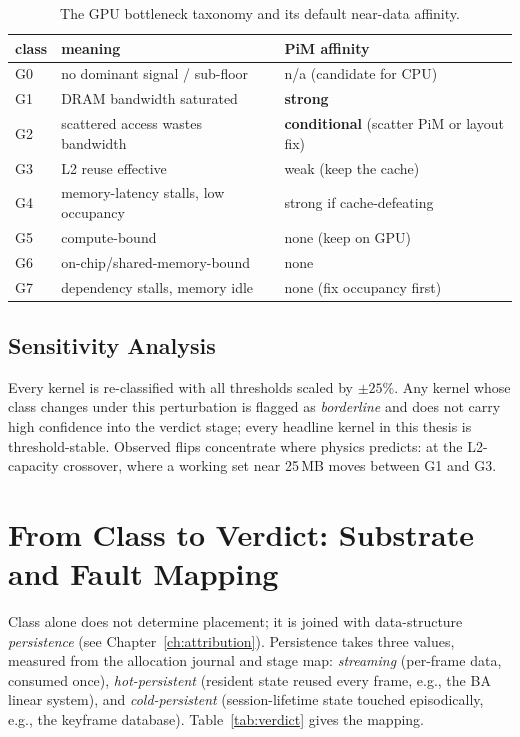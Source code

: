 \begin{table}[t]
\centering
\caption{The GPU bottleneck taxonomy and its default near-data affinity.}
\label{tab:taxonomy}
\begin{tabular}{@{}llp{}@{}}
\toprule
class & meaning & PiM affinity \\
\midrule
G0 & no dominant signal / sub-floor & n/a (candidate for CPU) \\
G1 & DRAM bandwidth saturated & \textbf{strong} \\
G2 & scattered access wastes bandwidth & \textbf{conditional} (scatter PiM or layout fix) \\
G3 & L2 reuse effective & weak (keep the cache) \\
G4 & memory-latency stalls, low occupancy & strong if cache-defeating \\
G5 & compute-bound & none (keep on GPU) \\
G6 & on-chip/shared-memory-bound & none \\
G7 & dependency stalls, memory idle & none (fix occupancy first) \\
\bottomrule
\end{tabular}
\end{table}

\subsection{Sensitivity Analysis}
\label{sec:met-sensitivity}
Every kernel is re-classified with all thresholds scaled by $\pm 25\%$. Any kernel whose class changes under this perturbation is flagged as \emph{borderline} and does not carry high confidence into the verdict stage; every headline kernel in this thesis is threshold-stable. Observed flips concentrate where physics predicts: at the L2-capacity crossover, where a working set near 25\,MB moves between G1 and G3.

\section{From Class to Verdict: Substrate and Fault Mapping}
\label{sec:met-verdict}

Class alone does not determine placement; it is joined with data-structure \emph{persistence} (see Chapter~\ref{ch:attribution}). Persistence takes three values, measured from the allocation journal and stage map: \emph{streaming} (per-frame data, consumed once), \emph{hot-persistent} (resident state reused every frame, e.g., the BA linear system), and \emph{cold-persistent} (session-lifetime state touched episodically, e.g., the keyframe database). Table~\ref{tab:verdict} gives the mapping.

